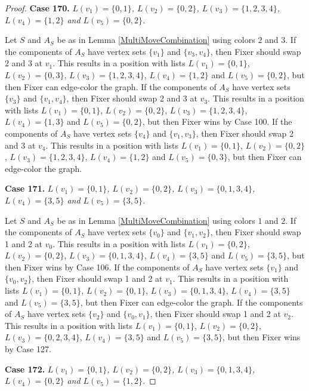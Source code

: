 \documentclass[12pt]{amsart}
\theoremstyle{plain}
\theoremstyle{definition}
\theoremstyle{remark}
\begin{document}
\begin{proof}
\noindent\textbf{Case 170.  }\textit{$L(v_1) = \{0, 1\}$, $L(v_2) = \{0, 2\}$, $L(v_3) = \{1, 2, 3, 4\}$, $L(v_4) = \{1, 2\}$ and $L(v_5) = \{0, 2\}$.}

Let $S$ and $A_S$ be as in Lemma \ref{MultiMoveCombination} using colors $2$ and $3$. If the components of $A_S$ have vertex sets $\{v_1\}$ and $\{v_3, v_4\}$, then Fixer should swap 2 and 3 at $v_1$. This results in a position with lists $L(v_1) = \{0, 1\}$, $L(v_2) = \{0, 3\}$, $L(v_3) = \{1, 2, 3, 4\}$, $L(v_4) = \{1, 2\}$ and $L(v_5) = \{0, 2\}$, but then Fixer can edge-color the graph. If the components of $A_S$ have vertex sets $\{v_3\}$ and $\{v_1, v_4\}$, then Fixer should swap 2 and 3 at $v_3$. This results in a position with lists $L(v_1) = \{0, 1\}$, $L(v_2) = \{0, 2\}$, $L(v_3) = \{1, 2, 3, 4\}$, $L(v_4) = \{1, 3\}$ and $L(v_5) = \{0, 2\}$, but then Fixer wins by Case 100. If the components of $A_S$ have vertex sets $\{v_4\}$ and $\{v_1, v_3\}$, then Fixer should swap 2 and 3 at $v_4$. This results in a position with lists $L(v_1) = \{0, 1\}$, $L(v_2) = \{0, 2\}$, $L(v_3) = \{1, 2, 3, 4\}$, $L(v_4) = \{1, 2\}$ and $L(v_5) = \{0, 3\}$, but then Fixer can edge-color the graph. 

\noindent\textbf{Case 171.  }\textit{$L(v_1) = \{0, 1\}$, $L(v_2) = \{0, 2\}$, $L(v_3) = \{0, 1, 3, 4\}$, $L(v_4) = \{3, 5\}$ and $L(v_5) = \{3, 5\}$.}

Let $S$ and $A_S$ be as in Lemma \ref{MultiMoveCombination} using colors $1$ and $2$. If the components of $A_S$ have vertex sets $\{v_0\}$ and $\{v_1, v_2\}$, then Fixer should swap 1 and 2 at $v_0$. This results in a position with lists $L(v_1) = \{0, 2\}$, $L(v_2) = \{0, 2\}$, $L(v_3) = \{0, 1, 3, 4\}$, $L(v_4) = \{3, 5\}$ and $L(v_5) = \{3, 5\}$, but then Fixer wins by Case 106. If the components of $A_S$ have vertex sets $\{v_1\}$ and $\{v_0, v_2\}$, then Fixer should swap 1 and 2 at $v_1$. This results in a position with lists $L(v_1) = \{0, 1\}$, $L(v_2) = \{0, 1\}$, $L(v_3) = \{0, 1, 3, 4\}$, $L(v_4) = \{3, 5\}$ and $L(v_5) = \{3, 5\}$, but then Fixer can edge-color the graph. If the components of $A_S$ have vertex sets $\{v_2\}$ and $\{v_0, v_1\}$, then Fixer should swap 1 and 2 at $v_2$. This results in a position with lists $L(v_1) = \{0, 1\}$, $L(v_2) = \{0, 2\}$, $L(v_3) = \{0, 2, 3, 4\}$, $L(v_4) = \{3, 5\}$ and $L(v_5) = \{3, 5\}$, but then Fixer wins by Case 127. 

\noindent\textbf{Case 172.  }\textit{$L(v_1) = \{0, 1\}$, $L(v_2) = \{0, 2\}$, $L(v_3) = \{0, 1, 3, 4\}$, $L(v_4) = \{0, 2\}$ and $L(v_5) = \{1, 2\}$.}


\end{proof}
\end{document}
